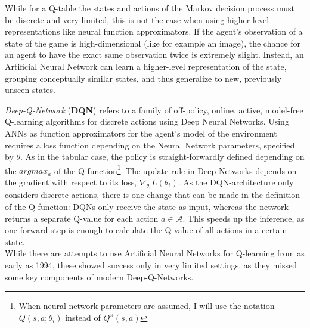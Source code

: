 While for a Q-table the states and actions of the Markov decision process must be discrete and very limited, this is not the case when using higher-level representations like neural function approximators. If the agent's observation of a state of the game is high-dimensional (like for example an image), the chance for an agent to have the exact same observation twice is extremely slight. Instead, an Artificial Neural Network can learn a higher-level representation of the state, grouping conceptually similar states, and thus generalize to new, previously unseen states. 

\textit{Deep-Q-Network} (\textbf{DQN}) refers to a family of off-policy, online, active, model-free Q-learning algorithms for discrete actions using Deep Neural Networks. %
Using ANNs as function approximators for the agent's model of the environment requires a loss function depending on the Neural Network parameters, specified by $\theta$. As in the tabular case, the policy is straight-forwardly defined depending on the $argmax_a$ of the Q-function\footnote{When neural network parameters are assumed, I will use the notation $Q(s,a;\theta_i)$ instead of $Q^\pi(s,a)$}. The update rule in Deep Networks depends on the gradient with respect to its loss, $\nabla_{\theta_i}L(\theta_i)$.  %
As the DQN-architecture only considers discrete actions, there is one change that can be made in the definition of the Q-function: DQNs only receive the state as input, whereas the network returns a separate Q-value for each action $a \in \mathcal{A}$. This speeds up the inference, as one forward step is enough to calculate the Q-value of all actions in a certain state.\\

While there are attempts to use Artificial Neural Networks for Q-learning from as early as 1994\cite{rummery_-line_1994}, these showed success only in very limited settings, as they missed some key components of modern Deep-Q-Networks. 

